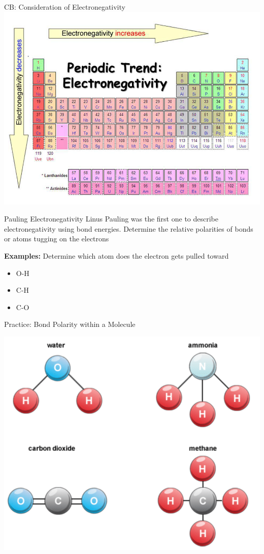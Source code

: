 \documentclass[11pt]{beamer}
\begin{document}
\begin{frame}{CB: Consideration of Electronegativity}
  \centering
  \includegraphics[width=\linewidth]{electronegativity}
\end{frame}

\begin{frame}{Pauling Electronegativity}
  Linus Pauling was the first one to describe electronegativity
  using bond energies. Determine the relative polarities of bonds
  or atoms tugging on the electrons

  \textbf{Examples:} Determine which atom does the electron
  gets pulled toward
  \begin{itemize}
  \item O-H
  \item C-H
  \item C-O
  \end{itemize}
\end{frame}

\begin{frame}{Practice: Bond Polarity within a Molecule}
  \begin{center}
    \includegraphics[width=0.6\linewidth]{molec_example}
  \end{center}
\end{frame}
\end{document}
